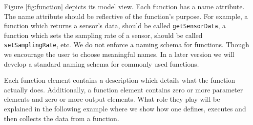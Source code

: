 Figure \ref{fig:function} depicts its model view. Each function has a
name attribute. The name attribute should be reflective of the
function's purpose. For example, a function which returns a sensor's
data, should be called \verb|getSensorData|, a function which sets the
sampling rate of a sensor, should be called \verb|setSamplingRate|,
etc. We do not enforce a naming schema for functions. Though we
encourage the user to choose meaningful names. In a later version we
will develop a standard naming schema for commonly used functions.

Each function element contains a description which
details what the function actually does. Additionally,
a function element contains zero or more parameter elements and zero or more
output elements. What role they play will be explained in the
following example where we show how one defines, executes and then collects the
data from a function.

